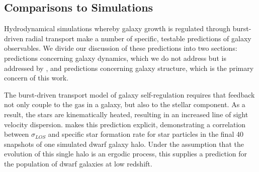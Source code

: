 \documentclass[iop]{emulateapj}
\begin{document}

\subsection{Comparisons to Simulations}

Hydrodynamical simulations whereby galaxy growth is regulated through burst-driven radial transport make a number of specific, testable predictions of galaxy observables. We divide our discussion of these predictions into two sections: predictions concerning galaxy dynamics, which we do not address but is addressed by \cite{Cicone16}, and predictions concerning galaxy structure, which is the primary concern of this work.

The burst-driven transport model of galaxy self-regulation requires that feedback not only couple to the gas in a galaxy, but also to the stellar component. As a result, the stars are kinematically heated, resulting in an increased line of sight velocity dispersion. \cite{El-Badry17} makes this prediction explicit, demonstrating a correlation between $\sigma_{LOS}$ and specific star formation rate for star particles in the final 40 snapshots of one simulated dwarf galaxy halo. Under the assumption that the evolution of this single halo is an ergodic process, this supplies a prediction for the population of dwarf galaxies at low redshift.
\end{document}
